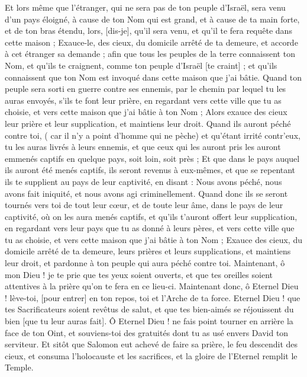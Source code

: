 \begin{multicols}{2}
Et lors même que l'étranger, qui ne sera pas de ton peuple d'Israël, sera venu d'un pays éloigné, à cause de ton Nom qui est grand, et à cause de ta main forte, et de ton bras étendu, lors, [dis-je], qu'il sera venu, et qu'il te fera requête dans cette maison ;
Exauce-le, des cieux, du domicile arrêté de ta demeure, et accorde à cet étranger sa demande ; afin que tous les peuples de la terre connaissent ton Nom, et qu'ils te craignent, comme ton peuple d'Israël [te craint] ; et qu'ils connaissent que ton Nom est invoqué dans cette maison que j'ai bâtie.
Quand ton peuple sera sorti en guerre contre ses ennemis, par le chemin par lequel tu les auras envoyés, s'ils te font leur prière, en regardant vers cette ville que tu as choisie, et vers cette maison que j'ai bâtie à ton Nom ;
Alors exauce des cieux leur prière et leur supplication, et maintiens leur droit.
Quand ils auront péché contre toi, ( car il n'y a point d'homme qui ne pèche) et qu'étant irrité contr'eux, tu les auras livrés à leurs ennemis, et que ceux qui les auront pris les auront emmenés captifs en quelque pays, soit loin, soit près ;
Et que dans le pays auquel ils auront été menés captifs, ils seront revenus à eux-mêmes, et que se repentant ils te supplient au pays de leur captivité, en disant : Nous avons péché, nous avons fait iniquité, et nous avons agi criminellement.
Quand donc ils se seront tournés vers toi de tout leur cœur, et de toute leur âme, dans le pays de leur captivité, où on les aura menés captifs, et qu'ils t'auront offert leur supplication, en regardant vers leur pays que tu as donné à leurs pères, et vers cette ville que tu as choisie, et vers cette maison que j'ai bâtie à ton Nom ;
Exauce des cieux, du domicile arrêté de ta demeure, leurs prières et leurs supplications, et maintiens leur droit, et pardonne à ton peuple qui aura péché contre toi.
Maintenant, ô mon Dieu ! je te prie que tes yeux soient ouverts, et que tes oreilles soient attentives à la prière qu'on te fera en ce lieu-ci.
Maintenant donc, ô Eternel Dieu ! lève-toi, [pour entrer] en ton repos, toi et l'Arche de ta force. Eternel Dieu ! que tes Sacrificateurs soient revêtus de salut, et que tes bien-aimés se réjouissent du bien [que tu leur auras fait].
Ô Eternel Dieu ! ne fais point tourner en arrière la face de ton Oint, et souviens-toi des gratuités dont tu as usé envers David ton serviteur.
\VerseOne{}Et sitôt que Salomon eut achevé de faire sa prière, le feu descendit des cieux, et consuma l'holocauste et les sacrifices, et la gloire de l'Eternel remplit le Temple.

\end{multicols}
